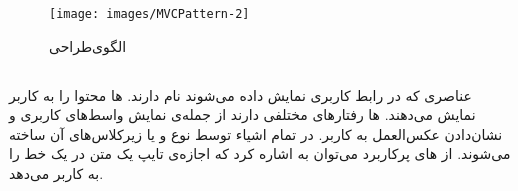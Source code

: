 \documentclass[oneside]{report}
\begin{document}
  \begin{figure}[h]
  	\centering
  	\texttt{[image: images/MVCPattern-2]}
  	\caption{الگوی‌طراحی  {\normalsize {}} }
  	\label{fig:mvcpattern-2}
  \end{figure}

\subsection{{\small {}}}
عناصری که در رابط کاربری نمایش داده می‌شوند 
  {\normalsize {}} 
  نام دارند. 
    {\normalsize {}} ها 
    محتوا را به کاربر نمایش می‌دهند.
      {\normalsize {}} 
      ها رفتارهای مختلفی دارند از جمله‌ی نمایش واسط‌های کاربری و نشان‌دادن عکس‌العمل به کاربر. 
در 
  {\normalsize {}} 
  تمام اشیاء 
    {\normalsize {}} 
    توسط نوع 
      {\normalsize {}} 
       و یا زیرکلاس‌های آن ساخته می‌شوند. از 
         {\normalsize {}}  های
   پرکاربرد می‌توان به 
     {\normalsize {}} 
     اشاره کرد که اجازه‌ی تایپ یک متن در یک خط را به کاربر می‌دهد.
\end{document}
